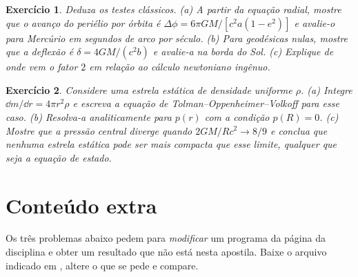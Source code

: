 \documentclass[12pt,a4paper,oneside]{book}
\theoremstyle{rgplain}
\newtheorem{exercise}{Exercício}[chapter]
\theoremstyle{rgremark}
\begin{document}
\begin{exercise}
Deduza os testes clássicos. (a) A partir da equação radial, mostre que o
avanço do periélio por órbita é
$\Delta\phi=6\pi GM/[c^2a(1-e^2)]$ e avalie-o para Mercúrio em segundos de
arco por século. (b) Para geodésicas nulas, mostre que a deflexão é
$\delta=4GM/(c^2b)$ e avalie-a na borda do Sol. (c) Explique de onde vem o
fator $2$ em relação ao cálculo newtoniano ingênuo.
\end{exercise}

\begin{exercise}
Considere uma estrela estática de densidade uniforme $\rho$.
(a) Integre $\dd m/\dd r=4\pi r^2\rho$ e escreva a equação de
Tolman--Oppenheimer--Volkoff para esse caso. (b) Resolva-a analiticamente para
$p(r)$ com a condição $p(R)=0$. (c) Mostre que a pressão central diverge
quando $2GM/Rc^2\to8/9$ e conclua que nenhuma estrela estática pode ser mais
compacta que esse limite, qualquer que seja a equação de estado.
\end{exercise}


\section{Conteúdo extra}

Os três problemas abaixo pedem para \emph{modificar} um programa da página da disciplina e obter um resultado que não está nesta apostila. Baixe o arquivo indicado em \href{\rgsitecodigos}{\texttt{\rgsitecodigos}}, altere o que se pede e compare.
\end{document}
